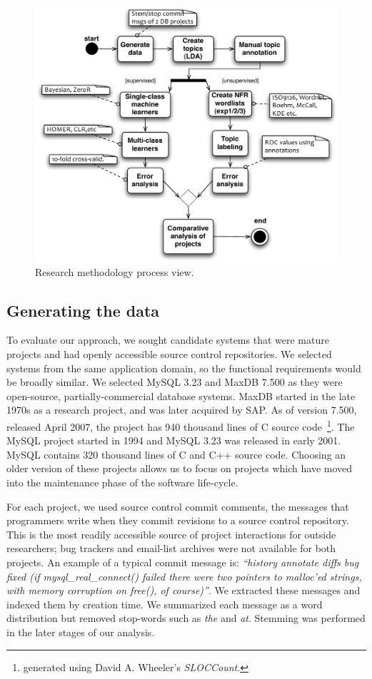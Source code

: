 \documentclass[]{sig-alternate}
\begin{document}
\begin{figure}
  \centering
 \includegraphics[width=.45\textwidth]{figures/process-model}
 \caption{Research methodology process view.}
  \label{fig:process}
\end{figure}

\subsection{Generating the data}
\label{sec:wordlist}

To evaluate our approach, we sought candidate systems that were mature projects and had openly accessible source control repositories. 
We selected systems from the same application domain, so the functional requirements would be broadly similar. 
We selected MySQL 3.23 and MaxDB 7.500 as they were open-source, partially-commercial database systems. 
MaxDB started in the late 1970s as a research project, and was later acquired by SAP. 
As of version 7.500, released April 2007, the project has 940 thousand lines of C source code~\footnote{generated using David A. Wheeler's \emph{SLOCCount}.}. 
The MySQL project started in 1994 and MySQL 3.23 was released in early 2001. 
MySQL contains 320 thousand lines of C and C++ source code.  
Choosing an older version of these projects allows us to focus on projects which have moved into the maintenance phase of the software life-cycle.

For each project, we used source control commit comments, the messages that programmers write when they commit revisions to a source control repository. 
This is the most readily accessible source of project interactions for outside researchers; bug trackers and email-list archives were not available for both projects. 
An example of a typical commit message is: \textit{``history annotate diffs bug fixed (if mysql\-\_real\-\_connect() failed there were two pointers to malloc'ed strings, with memory corruption on free(), of course)''}. 
We extracted these messages and indexed them by creation time. 
We summarized each message as a word distribution but removed stop-words such as \emph{the} and \emph{at}. 
Stemming was performed in the later stages of our analysis. %
\end{document}
